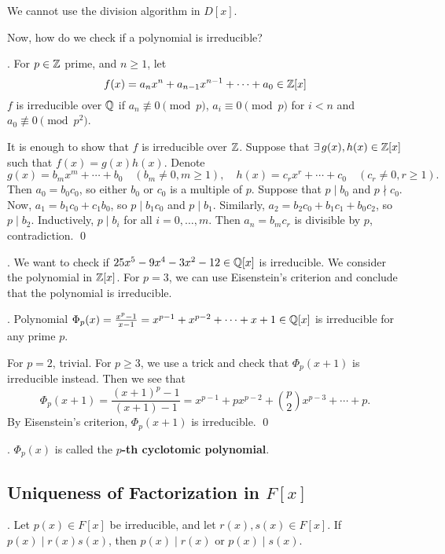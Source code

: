 \rmk We cannot use the division algorithm in \(D[x]\).

Now, how do we check if a polynomial is irreducible?

\thm.  For \(p \in \mathbb{Z}\) prime, and \(n \geq 1\), let
\[
    f(x) = a_n x^n + a_{n-1}x^{n-1} + \cdots + a_0 \in \mathbb{Z}[x]
\]
\(f\) is irreducible over \(\mathbb{Q}\) if \(a_n \not\equiv 0 \pmod p\), \(a_i \equiv 0 \pmod p\) for \(i < n\) and \(a_0 \not\equiv 0 \pmod {p^2}\).

\pf It is enough to show that \(f\) is irreducible over \(\mathbb{Z}\). Suppose that \(\exists g(x), h(x) \in \Z[x]\) such that \(f(x) = g(x)h(x)\). Denote
\[
    g(x) = b_m x^m + \cdots + b_0 \quad (b_m \neq 0, m\geq 1), \quad h(x) = c_r x^r + \cdots + c_0 \quad (c_r \neq 0, r \geq 1).
\]
Then \(a_0 = b_0 c_0\), so either \(b_0\) or \(c_0\) is a multiple of \(p\). Suppose that \(p \mid b_0\) and \(p \nmid c_0\). Now, \(a_1 = b_1c_0 + c_1b_0\), so \(p \mid b_1c_0\) and \(p \mid b_1\). Similarly, \(a_2 = b_2c_0 + b_1c_1 + b_0c_2\), so \(p \mid b_2\). Inductively, \(p \mid b_i\) for all \(i = 0, \dots, m\). Then \(a_n = b_m c_r\) is divisible by \(p\), contradiction. \qed

\ex. We want to check if \(25x^5 - 9x^4 - 3x^2 - 12 \in \mathbb{Q}[x]\) is irreducible. We consider the polynomial in \(\mathbb{Z}[x]\). For \(p = 3\), we can use Eisenstein's criterion and conclude that the polynomial is irreducible.

\cor. Polynomial \(\Phi_p(x) = \frac{x^p - 1}{x - 1} = x^{p - 1} + x^{p - 2} + \cdots + x + 1 \in \mathbb{Q}[x]\) is irreducible for any prime \(p\).

\pf For \(p = 2\), trivial. For \(p \geq 3\), we use a trick and check that \(\Phi_p(x+1)\) is irreducible instead. Then we see that
\[
    \Phi_p(x + 1) = \frac{(x+1)^p - 1}{(x + 1) - 1} = x^{p-1} + p x^{p-2} + {p \choose 2} x^{p-3} + \cdots + p.
\]
By Eisenstein's criterion, \(\Phi_p(x + 1)\) is irreducible. \qed

.  \(\Phi_p(x)\) is called the \textbf{\(p\)-th cyclotomic polynomial}.

\pagebreak

\subsection*{Uniqueness of Factorization in \(F[x]\)}

\thm. Let \(p(x) \in F[x]\) be irreducible, and let \(r(x), s(x) \in F[x]\). If \(p(x) \mid r(x)s(x)\), then \(p(x) \mid r(x)\) or \(p(x) \mid s(x)\).

